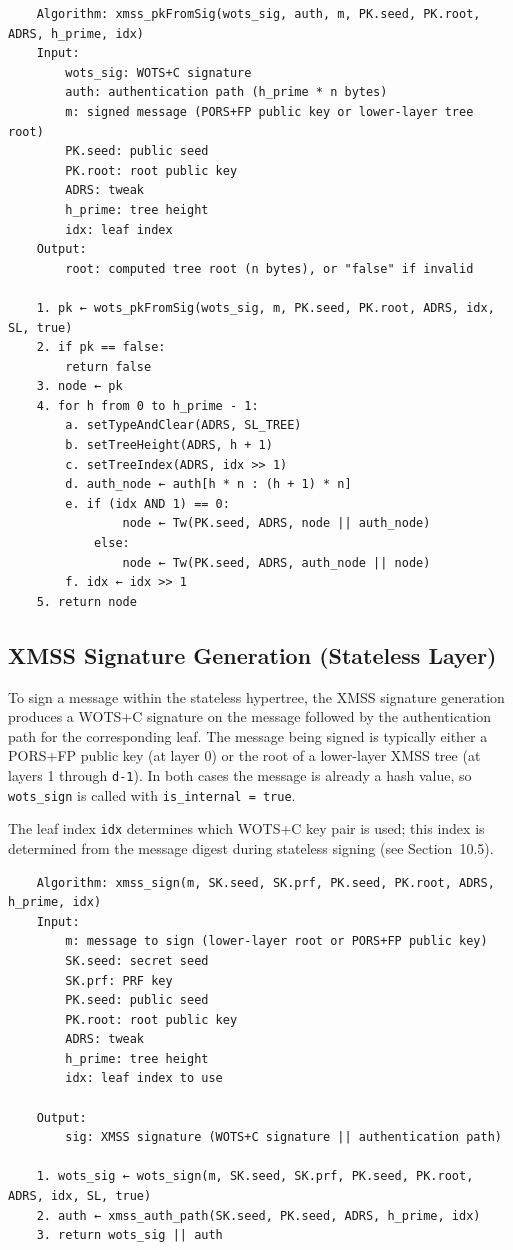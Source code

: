 \begin{verbatim}
    Algorithm: xmss_pkFromSig(wots_sig, auth, m, PK.seed, PK.root, ADRS, h_prime, idx)
    Input:
        wots_sig: WOTS+C signature
        auth: authentication path (h_prime * n bytes)
        m: signed message (PORS+FP public key or lower-layer tree root)
        PK.seed: public seed
        PK.root: root public key
        ADRS: tweak
        h_prime: tree height
        idx: leaf index
    Output:
        root: computed tree root (n bytes), or "false" if invalid

    1. pk ← wots_pkFromSig(wots_sig, m, PK.seed, PK.root, ADRS, idx, SL, true)
    2. if pk == false:
        return false
    3. node ← pk
    4. for h from 0 to h_prime - 1:
        a. setTypeAndClear(ADRS, SL_TREE)
        b. setTreeHeight(ADRS, h + 1)
        c. setTreeIndex(ADRS, idx >> 1)
        d. auth_node ← auth[h * n : (h + 1) * n]
        e. if (idx AND 1) == 0:
                node ← Tw(PK.seed, ADRS, node || auth_node)
            else:
                node ← Tw(PK.seed, ADRS, auth_node || node)
        f. idx ← idx >> 1
    5. return node
\end{verbatim}

\subsection{XMSS Signature Generation (Stateless Layer)}
To sign a message within the stateless hypertree, the XMSS signature generation produces a WOTS+C signature on the message followed by the authentication path for the corresponding leaf. The message being signed is typically either a PORS+FP public key (at layer 0) or the root of a lower-layer XMSS tree (at layers 1 through \texttt{d-1}). In both cases the message is already a hash value, so \texttt{wots\_sign} is called with \texttt{is\_internal = true}.

The leaf index \texttt{idx} determines which WOTS+C key pair is used; this index is determined from the message digest during stateless signing (see Section~10.5).

\begin{verbatim}
    Algorithm: xmss_sign(m, SK.seed, SK.prf, PK.seed, PK.root, ADRS, h_prime, idx)
    Input:
        m: message to sign (lower-layer root or PORS+FP public key)
        SK.seed: secret seed
        SK.prf: PRF key
        PK.seed: public seed
        PK.root: root public key
        ADRS: tweak
        h_prime: tree height
        idx: leaf index to use

    Output:
        sig: XMSS signature (WOTS+C signature || authentication path)

    1. wots_sig ← wots_sign(m, SK.seed, SK.prf, PK.seed, PK.root, ADRS, idx, SL, true)
    2. auth ← xmss_auth_path(SK.seed, PK.seed, ADRS, h_prime, idx)
    3. return wots_sig || auth
\end{verbatim}

